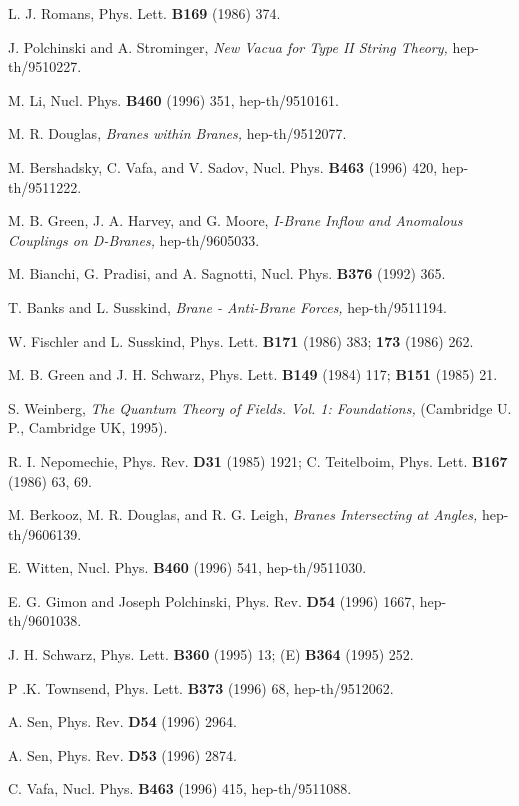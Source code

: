\documentclass[12pt]{article}
\begin{document}
\begin{thebibliography}{99}
L. J. Romans, Phys. Lett. {\bf B169} (1986) 374.

J. Polchinski and A. Strominger, {\it New Vacua for Type II String Theory,}
hep-th/9510227.

M. Li, Nucl. Phys. {\bf B460} (1996) 351, hep-th/9510161.

M. R. Douglas, {\it Branes within Branes,} hep-th/9512077.

M. Bershadsky, C. Vafa, and V. Sadov, Nucl. Phys. {\bf B463}
(1996) 420, hep-th/9511222.

M. B. Green, J. A. Harvey, and
G. Moore, {\it I-Brane Inflow and Anomalous Couplings on
D-Branes,} hep-th/9605033.

M. Bianchi, G. Pradisi, and A. Sagnotti, Nucl. Phys. {\bf B376} (1992)
365.

T. Banks and L. Susskind, {\it Brane - Anti-Brane Forces,}
hep-th/9511194.

W. Fischler and L.
Susskind, Phys. Lett. {\bf B171} (1986) 383; {\bf 173} (1986) 262.

M. B. Green and J. H. Schwarz, Phys. Lett.
{\bf B149} (1984) 117; {\bf B151} (1985) 21.

S. Weinberg, {\it The Quantum Theory of Fields.  Vol. 1: Foundations,}
(Cambridge U. P., Cambridge UK, 1995). 

R. I. Nepomechie, Phys. Rev. {\bf D31}
(1985) 1921;\hfil\break 
C. Teitelboim, Phys. Lett. {\bf B167} (1986) 63, 69.

M. Berkooz, M. R. Douglas, and R. G. Leigh, {\it Branes Intersecting at
Angles,} hep-th/9606139.

E. Witten, Nucl. Phys. {\bf B460} (1996) 541, hep-th/9511030.

E. G. Gimon and Joseph Polchinski, Phys. Rev. {\bf D54}
(1996) 1667, hep-th/9601038.

J. H. Schwarz, Phys. Lett.
{\bf B360} (1995) 13; (E) {\bf B364} (1995) 252.

P .K. Townsend, Phys. Lett. {\bf B373} (1996) 68, hep-th/9512062.

A. Sen, Phys. Rev. {\bf D54} (1996) 2964.

A. Sen, Phys. Rev. {\bf D53} (1996) 2874.

C. Vafa, Nucl. Phys. {\bf B463} (1996) 415, hep-th/9511088.


\end{thebibliography}
\end{document}
